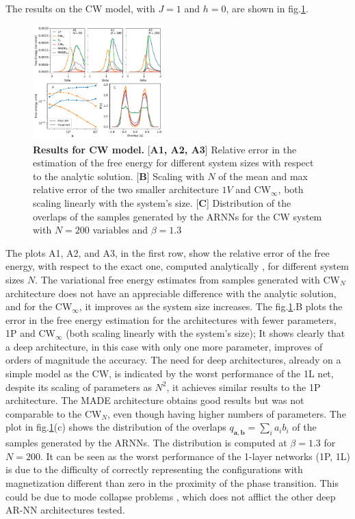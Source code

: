 \documentclass[aps,physrev,10pt,floatfix,reprint]{revtex4-2}
\begin{document}
The results on the CW model, with $J=1$ and $h=0$, are shown in fig.\ref{fig:curie_weiss}. 
\begin{figure}[h]
    \centering
    \includegraphics[width=0.45\textwidth]{img/CW_res.pdf}
    \caption{\textbf{Results for CW model.} [\textbf{A1, A2, A3}] Relative error in the estimation of the free energy for different system sizes with respect to the analytic solution. [\textbf{B}] Scaling with $N$ of the mean and max relative error of the two smaller architecture $1V$ and CW$_{\infty}$, both scaling linearly with the system's size. [\textbf{C}] Distribution of the overlaps of the samples generated by the ARNNs for the CW system with $N=200$ variables and $\beta=1.3$}
    \label{fig:curie_weiss}
\end{figure} 

The plots A1, A2, and A3, in the first row, show the relative error of the free energy, with respect to the exact one, computed analytically \cite{kadanoff2000statistical}, for different system sizes $N$.  
The variational free energy estimates from samples generated with CW$_N$ architecture does not have an appreciable difference with the analytic solution, and for the CW$_{\infty}$, it improves as the system size increases. The fig.\ref{fig:curie_weiss}.B plots the error in the free energy estimation for the architectures with fewer parameters, 1P and CW$_{\infty}$ (both scaling linearly with the system's size); It shows clearly that a deep architecture, in this case with only one more parameter, improves of orders of magnitude the accuracy. The need for deep architectures, already on a simple model as the CW, is indicated by the worst performance of the 1L net, despite its scaling of parameters as $N^2$, it achieves similar results to the 1P architecture. The MADE architecture obtains good results but was not comparable to the CW$_N$, even though having higher numbers of parameters. The plot in fig.\ref{fig:curie_weiss}(c) shows the distribution of the overlaps $q_{\mathbf{a}, \mathbf{b}}=\sum_{i} a_i b_i$ of the samples generated by the ARNNs. The distribution is computed at $\beta=1.3$ for $N=200$. It can be seen as the worst performance of the 1-layer networks (1P, 1L) is due to the difficulty of correctly representing the configurations with magnetization different than zero in the proximity of the phase transition. This could be due to mode collapse problems \cite{https://doi.org/10.48550/arxiv.2210.11145}, which does not afflict the other deep AR-NN architectures tested.\\
\end{document}
